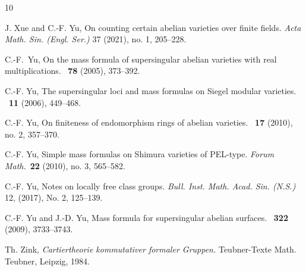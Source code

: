 \documentclass[]{amsart}
\theoremstyle{plain}
\theoremstyle{definition}
\theoremstyle{remark}
\newcommand{\<}{\langle}   %
\renewcommand{\>}{\rangle} %
\begin{document}
\begin{thebibliography}{10}
    
 J. Xue and C.-F. Yu,  On counting certain abelian    
  varieties over finite fields.  
  {\it Acta Math. Sin. (Engl. Ser.)} 37 (2021), no. 1, 205--228.
  
 C.-F.~Yu, On the mass formula of supersingular
  abelian varieties with real multiplications. \jaums~{\bf 78} (2005),
  373--392.

 C.-F. Yu, The supersingular loci and mass
  formulas on Siegel modular varieties. \docmath~{\bf 11} (2006),
  449--468.  


 C.-F. Yu, On finiteness of endomorphism rings of
  abelian varieties. \mrl~{\bf 17} (2010), no. 2, 357--370.

 C.-F. Yu, Simple mass formulas on Shimura varieties of
  PEL-type. {\it Forum Math.}~{\bf 22} (2010), no. 3, 565--582.

 C.-F. Yu, Notes on locally free class groups. {\it
    Bull. Inst. Math. Acad. Sin. (N.S.)} 12, (2017), No. 2,
  125--139. 


  C.-F. Yu and J.-D. Yu, Mass formula for supersingular abelian
  surfaces. \ja~{\bf 322} (2009), 3733--3743. 
  
 Th. Zink, {\it Cartiertheorie kommutativer
  formaler Gruppen. } Teubner-Texte Math. Teubner, Leipzig, 1984.

\end{thebibliography}
\end{document}
